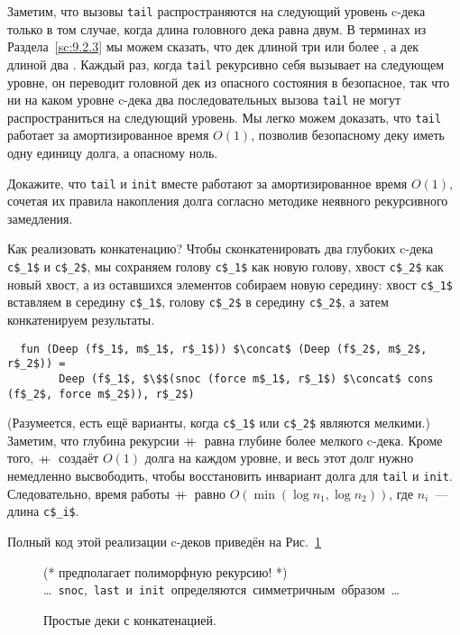 Заметим, что вызовы \lstinline!tail! распространяются на следующий
уровень c-дека только в том случае, когда длина головного дека равна
двум. В терминах из Раздела~\ref{sc:9.2.3} мы можем сказать, что дек
длиной три или более , а дек длиной два
.  Каждый раз, когда \lstinline!tail!
рекурсивно себя вызывает на следующем уровне, он переводит головной
дек из опасного состояния в безопасное, так что ни на каком уровне
c-дека два последовательных вызова \lstinline!tail! не могут
распространиться на следующий уровень. Мы легко можем доказать, что
\lstinline!tail! работает за амортизированное время $O(1)$, позволив
безопасному деку иметь одну единицу долга, а опасному ноль.

\begin{exercise}\label{ex:11.3}
  Докажите, что \lstinline!tail! и \lstinline!init! вместе работают за
  амортизированное время $O(1)$, сочетая их правила накопления долга
  согласно методике неявного рекурсивного замедления.
\end{exercise}

Как реализовать конкатенацию? Чтобы сконкатенировать два глубоких
c-дека \lstinline!c$_1$! и \lstinline!c$_2$!, мы сохраняем голову
\lstinline!c$_1$! как новую голову, хвост \lstinline!c$_2$! как новый
хвост, а из оставшихся элементов собираем новую середину: хвост
\lstinline!c$_1$! вставляем в середину \lstinline!c$_1$!, голову
\lstinline!c$_2$! в середину \lstinline!c$_2$!, а затем конкатенируем
результаты.
\begin{lstlisting}
  fun (Deep (f$_1$, m$_1$, r$_1$)) $\concat$ (Deep (f$_2$, m$_2$, r$_2$)) =
        Deep (f$_1$, $\$$(snoc (force m$_1$, r$_1$) $\concat$ cons (f$_2$, force m$_2$)), r$_2$)
\end{lstlisting}
(Разумеется, есть ещё варианты, когда \lstinline!c$_1$! или
\lstinline!c$_2$! являются мелкими.) Заметим, что глубина рекурсии
$+\!\!\!+\,$ равна глубине более мелкого c-дека. Кроме того, $+\!\!\!+\,$
создаёт $O(1)$ долга на каждом уровне, и весь этот долг нужно
немедленно высвободить, чтобы восстановить инвариант долга для
\lstinline!tail! и \lstinline!init!. Следовательно, время работы
$+\!\!\!+\,$ равно $O(\min (\log n_1, \log n_2))$, где $n_i$~--- длина
\lstinline!c$_i$!. 

Полный код этой реализации c-деков приведён на Рис.~\ref{fig:11.3}

\begin{figure}
  \centering
  (* $\mbox{предполагает полиморфную рекурсию!}$ *)  \\
  \mbox{\ldots{} \lstinline!snoc!, \lstinline!last! и \lstinline!init!
    определяются симметричным образом \ldots}\\
  
  \caption{Простые деки с конкатенацией.}
  \label{fig:11.3}
\end{figure}

